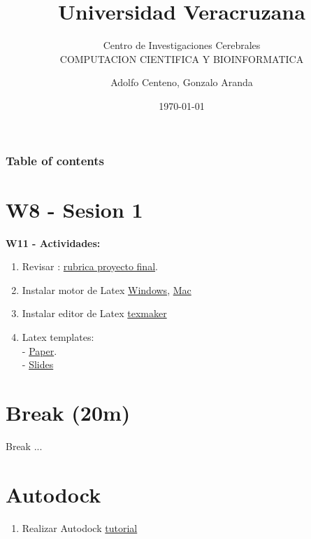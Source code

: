 \documentclass{beamer}
\begin{document}
\title{Universidad Veracruzana}  
\subtitle{Centro de Investigaciones Cerebrales\\COMPUTACION CIENTIFICA Y BIOINFORMATICA}
\author{Adolfo Centeno, Gonzalo Aranda}
\date{\today} 


\begin{frame}
\titlepage
\end{frame}

\begin{frame}\frametitle{Table of contents}
\tableofcontents
\end{frame} 


\section{W8 - Sesion 1 }

\begin{frame}

\textbf{W11 - Actividades:}

\begin{enumerate}

\item
	Revisar : \href{https://www.youtube.com/watch?v=XRcx8-2lLJI}{rubrica proyecto final}.	

\item Instalar  motor de Latex \href{https://miktex.org/download} {Windows}, \href {http://www.tug.org/mactex/mactex-download.html} {Mac}

\item Instalar editor de Latex \href{https://www.xm1math.net/texmaker/download.html}{texmaker}


\item
    Latex templates:  \\
    - \href{https://github.com/adsoftsito/metodos-numericos/blob/master/w8/simplepaper.tex}{Paper}. \\
    - \href{https://github.com/adsoftsito/metodos-numericos/blob/master/w8/semana8_sesion1.tex}{Slides} 

	

\end{enumerate} 

\end{frame}


\section{Break  (20m) }

\begin{frame}


Break ...

\end{frame}




\section{Autodock }

\begin{frame}

\begin{enumerate}

\item  Realizar Autodock \href{}{tutorial}   
\end{enumerate} 


\end{frame}
\end{document}
